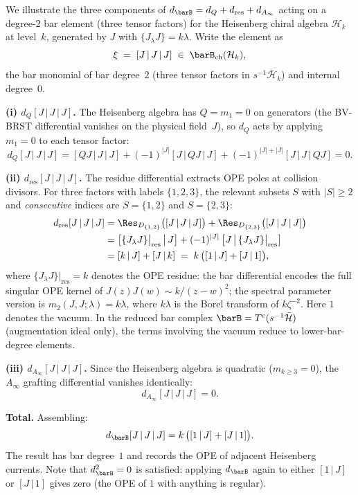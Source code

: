\begin{computation}
\label{comp:heisenberg-bar-degree2}
We illustrate the three components of $d_{\barB} = d_Q + d_{\mathrm{res}} + d_{A_\infty}$
acting on a degree-2 bar element (three tensor factors) for the
Heisenberg chiral algebra $\mathcal{H}_k$ at level~$k$, generated
by $J$ with $\{J_\lambda J\} = k\lambda$. Write the element as
\[
\xi \;=\; [J \,|\, J \,|\, J]
 \;\in\; \barB_{\mathrm{ch}}(\mathcal{H}_k),
\]
the bar monomial of bar degree~$2$ (three tensor factors in
$s^{-1}\bar{\mathcal{H}}_k$) and internal degree~$0$.

\medskip\noindent
\textbf{(i) $d_Q[J\,|\,J\,|\,J]$.}
The Heisenberg algebra has $Q = m_1 = 0$ on generators (the BV-BRST
differential vanishes on the physical field~$J$), so $d_Q$ acts by
applying $m_1 = 0$ to each tensor factor:
\[
d_Q[J\,|\,J\,|\,J]
= [QJ\,|\,J\,|\,J]
 + (-1)^{|J|}[J\,|\,QJ\,|\,J]
 + (-1)^{|J|+|J|}[J\,|\,J\,|\,QJ]
= 0.
\]

\medskip\noindent
\textbf{(ii) $d_{\mathrm{res}}[J\,|\,J\,|\,J]$.}
The residue differential extracts OPE poles at collision divisors.
For three factors with labels $\{1,2,3\}$, the relevant subsets
$S$ with $|S| \geq 2$ and \emph{consecutive} indices are
$S = \{1,2\}$ and $S = \{2,3\}$:
\begin{align*}
d_{\mathrm{res}}[J\,|\,J\,|\,J]
&= \Res_{D_{\{1,2\}}}\bigl([J\,|\,J\,|\,J]\bigr)
 + \Res_{D_{\{2,3\}}}\bigl([J\,|\,J\,|\,J]\bigr) \\
&= \bigl[\{J_\lambda J\}\big|_{\mathrm{res}}\,\big|\,J\bigr]
 + (-1)^{|J|}\,\bigl[J\,\big|\,\{J_\lambda J\}\big|_{\mathrm{res}}\bigr] \\
&= [k\,|\,J] + [J\,|\,k]
\;=\; k\,\bigl([1\,|\,J] + [J\,|\,1]\bigr),
\end{align*}
where $\{J_\lambda J\}\big|_{\mathrm{res}} = k$ denotes the OPE residue:
the bar differential encodes the full singular OPE kernel of
$J(z)J(w) \sim k/(z-w)^2$; the spectral parameter version is
$m_2(J,J;\lambda) = k\lambda$, where $k\lambda$ is the Borel transform
of $k\zeta^{-2}$. Here $1$ denotes the vacuum.
In the reduced bar complex $\barB = T^c(s^{-1}\bar{\mathcal{H}})$
(augmentation ideal only), the terms involving the vacuum reduce to
lower-bar-degree elements.

\medskip\noindent
\textbf{(iii) $d_{A_\infty}[J\,|\,J\,|\,J]$.}
Since the Heisenberg algebra is quadratic ($m_{k \geq 3} = 0$), the
$A_\infty$ grafting differential vanishes identically:
\[
d_{A_\infty}[J\,|\,J\,|\,J] = 0.
\]

\medskip\noindent
\textbf{Total.}
Assembling:
\[
d_{\barB}[J\,|\,J\,|\,J]
= k\,\bigl([1\,|\,J] + [J\,|\,1]\bigr).
\]
The result has bar degree~$1$ and records the OPE of adjacent
Heisenberg currents. Note that $d_{\barB}^2 = 0$ is satisfied:
applying $d_{\barB}$ again to either $[1\,|\,J]$ or $[J\,|\,1]$
gives zero (the OPE of $1$ with anything is regular).
\end{computation}

